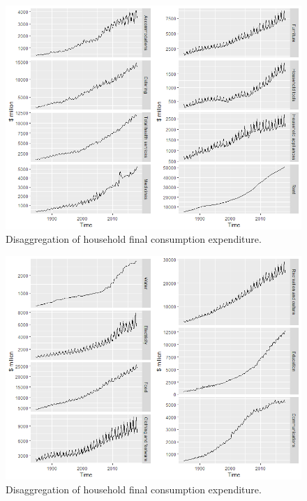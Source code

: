 \documentclass[graybox]{svmult}
\begin{document}
\begin{figure}[H]
	\centering
	\small
	\includegraphics[scale=0.5]{Figs/TS-plots/EXP-hierarchy/set-14.png}
	\caption{Disaggregation of household final consumption expenditure.}\label{EXP-set-14}
\end{figure}

\begin{figure}[H]
	\centering
	\small
	\includegraphics[scale=0.5]{Figs/TS-plots/EXP-hierarchy/set-15.png}
	\caption{Disaggregation of household final consumption expenditure.}\label{EXP-set-15}
\end{figure}

\pagebreak



\end{document}
